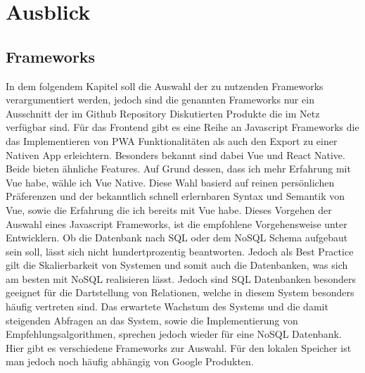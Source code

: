 \chapter{Ausblick}
\label{cha:Ausblick}

\section{Frameworks}
In dem folgendem Kapitel soll die Auswahl der zu nutzenden Frameworks verargumentiert werden, jedoch sind die genannten Frameworks nur ein Ausschnitt der im Github Repository Diskutierten Produkte die im Netz verfügbar sind.
Für das Frontend gibt es eine Reihe an Javascript Frameworks die das Implementieren von PWA Funktionalitäten als auch den Export zu einer Nativen App erleichtern. Besonders bekannt sind dabei Vue und React Native. Beide bieten ähnliche Features. Auf Grund dessen, dass ich mehr Erfahrung mit Vue habe, wähle ich Vue Native. Diese Wahl basierd auf reinen persönlichen Präferenzen und der bekanntlich schnell erlernbaren Syntax und Semantik von Vue, sowie die Erfahrung die ich bereits mit Vue habe. Dieses Vorgehen der Auswahl eines Javascript Frameworks, ist die empfohlene Vorgehensweise unter Entwicklern.
Ob die Datenbank nach SQL oder dem NoSQL Schema aufgebaut sein soll, lässt sich nicht hundertprozentig beantworten. Jedoch als Best Practice gilt die Skalierbarkeit von Systemen und somit auch die Datenbanken, was sich am besten mit NoSQL realisieren lässt. Jedoch sind SQL Datenbanken besonders geeignet für die Dartstellung von Relationen, welche in diesem System besonders häufig vertreten sind. Das erwartete Wachstum des Systems und die damit steigenden Abfragen an das System, sowie die Implementierung von Empfehlungsalgorithmen, sprechen jedoch wieder für eine NoSQL Datenbank. Hier gibt es verschiedene Frameworks zur Auswahl. Für den lokalen Speicher ist man jedoch noch häufig abhängig von Google Produkten.

